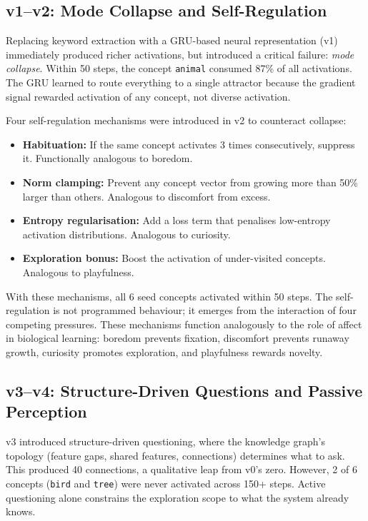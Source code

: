 \documentclass[conference]{IEEEtran}
\begin{document}
\subsection{v1--v2: Mode Collapse and Self-Regulation}

Replacing keyword extraction with a GRU-based neural representation (v1) immediately produced richer activations, but introduced a critical failure: \emph{mode collapse}. Within 50 steps, the concept \texttt{animal} consumed 87\% of all activations. The GRU learned to route everything to a single attractor because the gradient signal rewarded activation of any concept, not diverse activation.

Four self-regulation mechanisms were introduced in v2 to counteract collapse:

\begin{itemize}[leftmargin=*]
\item \textbf{Habituation:} If the same concept activates 3 times consecutively, suppress it. Functionally analogous to boredom.
\item \textbf{Norm clamping:} Prevent any concept vector from growing more than 50\% larger than others. Analogous to discomfort from excess.
\item \textbf{Entropy regularisation:} Add a loss term that penalises low-entropy activation distributions. Analogous to curiosity.
\item \textbf{Exploration bonus:} Boost the activation of under-visited concepts. Analogous to playfulness.
\end{itemize}

With these mechanisms, all 6 seed concepts activated within 50 steps. The self-regulation is not programmed behaviour; it emerges from the interaction of four competing pressures. These mechanisms function analogously to the role of affect in biological learning: boredom prevents fixation, discomfort prevents runaway growth, curiosity promotes exploration, and playfulness rewards novelty.

\subsection{v3--v4: Structure-Driven Questions and Passive Perception}

v3 introduced structure-driven questioning, where the knowledge graph's topology (feature gaps, shared features, connections) determines what to ask. This produced 40 connections, a qualitative leap from v0's zero. However, 2 of 6 concepts (\texttt{bird} and \texttt{tree}) were never activated across 150+ steps. Active questioning alone constrains the exploration scope to what the system already knows.
\end{document}
